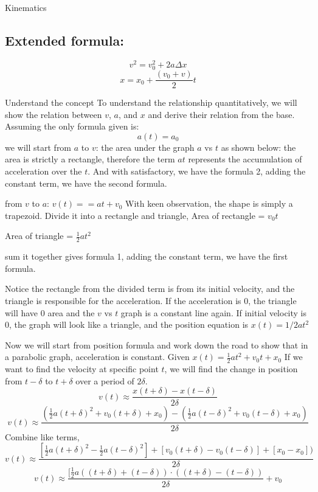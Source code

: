 \documentclass[]{scrreprt}
\begin{document}
\begin{section} {Kinematics}
		\subsection{Extended formula:}
		$$v^2 = v_0^2+2a\Delta x$$
		$$x=x_0+\frac{(v_0+v)}{2}t$$
	
	\begin{subsection}{Understand the concept}
		To understand the relationship quantitatively, we will show the relation between $v$, $a$, and $x$ and derive their relation from the base.
		Assuming the only formula given is:
		$$a(t) = a_0$$
		we will start from $a$ to $v$:
		the area under the graph $a$ vs $t$ as shown below:
		the area is strictly a rectangle, therefore the term $at$ represents the accumulation of acceleration over the $t$. And with satisfactory, we have the formula 2, adding the constant term, we have the second formula.
		
		from $v$ to $a$:
		$v(t) = =at+v_0$
		With keen observation, the shape is simply a trapezoid. Divide it into a rectangle and triangle, 
		Area of rectangle = $v_0t$
		
		Area of triangle = $\frac{1}{2} a t^2$
		
		sum it together gives formula 1, adding the constant term, we have the first formula.
		
		Notice the rectangle from the divided term is from its initial velocity, and the triangle is responsible for the acceleration. If the acceleration is $0$, the triangle will have $0$ area and the $v$ vs $t$ graph is a constant line again. If initial velocity is $0$, the graph will look like a triangle, and the position equation is $x(t) = 1/2 a t^2$
				
		Now we will start from position formula and work down the road to show that in a parabolic graph, acceleration is constant.
		Given $x(t) = \frac{1}{2}at^2 + v_0t+x_0$ 
		If we want to find the velocity at specific point $t$, we will find the change in position from $t-\delta$ to $t+\delta$ over a period of $2\delta$.
		 $$v(t)\approx \frac{x(t+\delta)-x(t-\delta)}{2\delta}$$
		 $$v(t)\approx \frac{(\frac{1}{2}a(t+\delta)^2 + v_0(t+\delta) + x_0)-
		 					 (\frac{1}{2}a(t-\delta)^2 + v_0(t-\delta)+x_0)}{2\delta}$$
	 	Combine like terms,
	 	$$v(t)\approx \frac{[\frac{1}{2}a(t+\delta)^2-
	 		\frac{1}{2}a(t-\delta)^2] + [v_0(t+\delta)-v_0(t-\delta)]+[x_0-x_0])}{2\delta}$$
		 $$v(t) \approx \frac{[\frac{1}{2}a((t+\delta)+(t-\delta))\cdot((t+\delta)-(t-\delta))}{2\delta} + v_0$$
		

\end{subsection}
\end{section}
\end{document}
